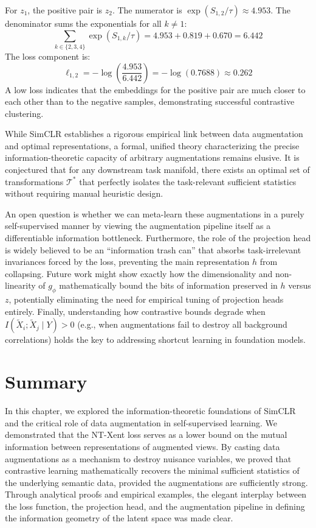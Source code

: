 For $z_1$, the positive pair is $z_2$. The numerator is $\exp(S_{1,2}/\tau) \approx 4.953$.
The denominator sums the exponentials for all $k \neq 1$:
\begin{equation}
\sum_{k \in \{2,3,4\}} \exp(S_{1,k}/\tau) = 4.953 + 0.819 + 0.670 = 6.442
\end{equation}
The loss component is:
\begin{equation}
\ell_{1,2} = -\log\left(\frac{4.953}{6.442}\right) = -\log(0.7688) \approx 0.262
\end{equation}
A low loss indicates that the embeddings for the positive pair are much closer to each other than to the negative samples, demonstrating successful contrastive clustering.

\begin{horizon}
While SimCLR establishes a rigorous empirical link between data augmentation and optimal representations, a formal, unified theory characterizing the precise information-theoretic capacity of arbitrary augmentations remains elusive. It is conjectured that for any downstream task manifold, there exists an optimal set of transformations $\mathcal{T}^*$ that perfectly isolates the task-relevant sufficient statistics without requiring manual heuristic design. 

An open question is whether we can meta-learn these augmentations in a purely self-supervised manner by viewing the augmentation pipeline itself as a differentiable information bottleneck. Furthermore, the role of the projection head is widely believed to be an ``information trash can'' that absorbs task-irrelevant invariances forced by the loss, preventing the main representation $h$ from collapsing. Future work might show exactly how the dimensionality and non-linearity of $g_\phi$ mathematically bound the bits of information preserved in $h$ versus $z$, potentially eliminating the need for empirical tuning of projection heads entirely. Finally, understanding how contrastive bounds degrade when $I(\tilde{X}_i; \tilde{X}_j \mid Y) > 0$ (e.g., when augmentations fail to destroy all background correlations) holds the key to addressing shortcut learning in foundation models.
\end{horizon}

\section{Summary}

In this chapter, we explored the information-theoretic foundations of SimCLR and the critical role of data augmentation in self-supervised learning. We demonstrated that the NT-Xent loss serves as a lower bound on the mutual information between representations of augmented views. By casting data augmentations as a mechanism to destroy nuisance variables, we proved that contrastive learning mathematically recovers the minimal sufficient statistics of the underlying semantic data, provided the augmentations are sufficiently strong. Through analytical proofs and empirical examples, the elegant interplay between the loss function, the projection head, and the augmentation pipeline in defining the information geometry of the latent space was made clear.

